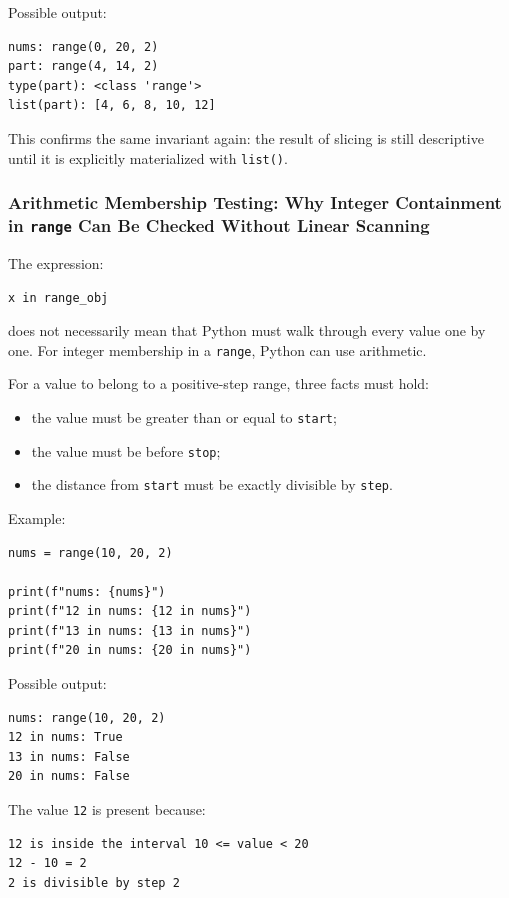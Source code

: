 \documentclass[a4paper,twoside]{report}
\begin{document}
Possible output:

\begin{verbatim}
nums: range(0, 20, 2)
part: range(4, 14, 2)
type(part): <class 'range'>
list(part): [4, 6, 8, 10, 12]
\end{verbatim}

This confirms the same invariant again: the result of slicing is still descriptive until it is explicitly materialized with \texttt{list()}.

\subsubsection{Arithmetic Membership Testing: Why Integer Containment in \texttt{range} Can Be Checked Without Linear Scanning}

The expression:

\begin{verbatim}
x in range_obj
\end{verbatim}

does not necessarily mean that Python must walk through every value one by one. For integer membership in a \texttt{range}, Python can use arithmetic.

For a value to belong to a positive-step range, three facts must hold:

\begin{itemize}
    \item the value must be greater than or equal to \texttt{start};
    \item the value must be before \texttt{stop};
    \item the distance from \texttt{start} must be exactly divisible by \texttt{step}.
\end{itemize}

Example:

\begin{verbatim}
nums = range(10, 20, 2)

print(f"nums: {nums}")
print(f"12 in nums: {12 in nums}")
print(f"13 in nums: {13 in nums}")
print(f"20 in nums: {20 in nums}")
\end{verbatim}

Possible output:

\begin{verbatim}
nums: range(10, 20, 2)
12 in nums: True
13 in nums: False
20 in nums: False
\end{verbatim}

The value \texttt{12} is present because:

\begin{verbatim}
12 is inside the interval 10 <= value < 20
12 - 10 = 2
2 is divisible by step 2
\end{verbatim}
\end{document}

